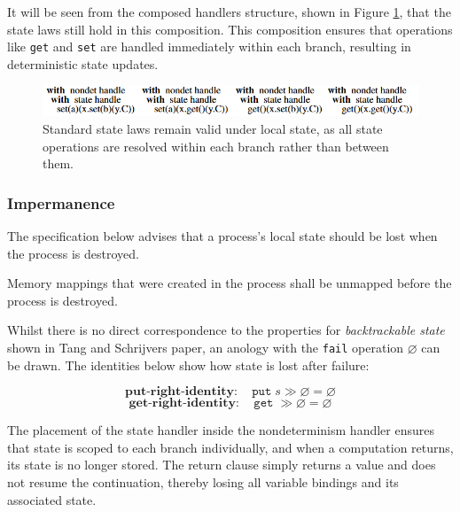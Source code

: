 \documentclass[logo,bsc,singlespacing,parskip]{infthesis}
\begin{document}
It will be seen from the composed handlers structure, shown in Figure \ref{fig:local-state-laws}, that the state laws still hold in this composition. This composition ensures that operations like \lstinline{get} and \lstinline{set} are handled immediately within each branch, resulting in deterministic state updates.
\begin{figure}[H]

\centering
\vspace{1em}
\includegraphics[width=1\textwidth]{localStateHandlerComp.png}

\caption{Standard state laws remain valid under local state, as all state operations are resolved within each branch rather than between them.}
\label{fig:local-state-laws}
\end{figure}


\subsubsection{Impermanence} 
The specification below advises that a process's local state should be lost when the process is destroyed.

\begin{tcolorbox}[colback=gray!10, colframe=gray!60, sharp corners, boxrule=0.5pt, title={POSIX Base Specifications, Issue 7, p.554}]
Memory mappings that were created in the process shall be unmapped before the process
 is destroyed.
 \end{tcolorbox}
 
Whilst there is no direct correspondence to the properties for \textit{backtrackable state} shown in Tang and Schrijvers paper, an anology with the \lstinline{fail} operation $\varnothing$ can be drawn. The identities below show how state is lost after failure: 

\[
\textbf{put-right-identity}: \quad \texttt{put}\;s \gg \varnothing = \varnothing
\]
\vspace{-1em}
\[
\textbf{get-right-identity}: \quad \texttt{get}\; \gg \varnothing = \varnothing
\]

The placement of the state handler inside the nondeterminism handler ensures that state is scoped to each branch individually, and when a computation returns, its state is no longer stored. The return clause simply returns a value and does not resume the continuation, thereby losing all variable bindings and its associated state. 
\end{document}
